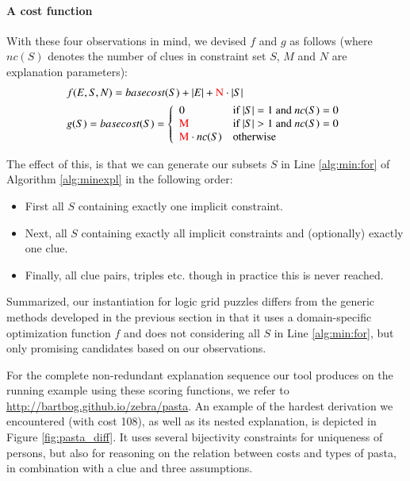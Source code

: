 \paragraph{A cost function}
With these four observations in mind, we devised $f$ and $g$ as follows (where $nc(S)$ denotes the number of clues in constraint set $S$, $M$ and $N$ are explanation parameters): \label{sec:cost}
\begin{align*}&f(E,S,N) = basecost(S) + |E| + \text{\color{red} {N}} \cdot|S|\\
&g(S) = basecost(S) = \left\{\begin{array}{ll}
                               0 & \text{if $|S|=1$ and $nc(S) = 0$}\\
                               \text{\color{red} {M}} & \text{if $|S|>1$ and $nc(S)=0$}\\
                               \text{\color{red} {M}}\cdot nc(S) & \text{otherwise}
                              \end{array}\right.
                              \end{align*}
   
The effect of this, is that we can generate our subsets $S$ in Line \ref{alg:min:for}
 of Algorithm \ref{alg:minexpl} in the following order:
\begin{itemize}
 \item First all $S$ containing exactly one implicit constraint.
 \item Next, all $S$ containing exactly all implicit constraints and (optionally) exactly one clue.
 \item Finally, all clue pairs, triples etc. though in practice this is never reached.
\end{itemize}
Summarized, our instantiation for logic grid puzzles differs from the generic methods developed in the previous section in that it uses a domain-specific optimization function $f$ and does not considering all $S$ in Line \ref{alg:min:for}, but only promising candidates based on our observations.

For the complete non-redundant explanation sequence our tool produces on the running example using these scoring functions, we refer to \url{http://bartbog.github.io/zebra/pasta}. An example of the hardest derivation we encountered (with cost 108), as well as its nested explanation, is depicted in Figure \ref{fig:pasta_diff}. It uses several bijectivity constraints for uniqueness of persons, but also for reasoning on the relation between costs and types of pasta, in combination with a clue and three assumptions.



